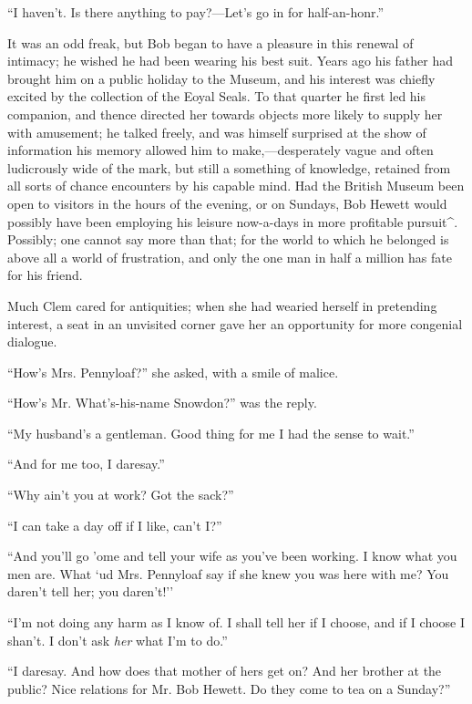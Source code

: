 {\protect\hypertarget{242}{}{}}``I haven't. Is there anything to
pay?---Let's go in for half-an-honr.''

It was an odd freak, but Bob began to have a pleasure in this renewal of
intimacy; he wished he had been wearing his best suit. Years ago his
father had brought him on a public holiday to the Museum, and his
interest was chiefly excited by the collection of the Eoyal Seals. To
that quarter he first led his companion, and thence directed her towards
objects more likely to supply her with amusement; he talked freely, and
was himself surprised at the show of information his memory allowed him
to make,---desperately vague and often ludicrously wide of the mark, but
still a something of knowledge, retained from all sorts of chance
encounters by his capable mind. Had the British Museum been open to
visitors in the hours of the evening, or on Sundays, Bob Hewett would
possibly have been employing his leisure now-a-days in more profitable
pursuit\^{}. Possibly; one cannot say more than that; for the world to
which he belonged is above all {\protect\hypertarget{243}{}{}}a world of
frustration, and only the one man in half a million has fate for his
friend.

Much Clem cared for antiquities; when she had wearied herself in
pretending interest, a seat in an unvisited corner gave her an
opportunity for more congenial dialogue.

``How's Mrs. Pennyloaf?'' she asked, with a smile of malice.

``How's Mr. What's-his-name Snowdon?'' was the reply.

``My husband's a gentleman. Good thing for me I had the sense to wait.''

``And for me too, I daresay.''

``Why ain't you at work? Got the sack?''

``I can take a day off if I like, can't I?''

``And you'll go 'ome and tell your wife as you've been working. I know
what you men are. What `ud Mrs. Pennyloaf say if she knew you was here
with me? You daren't tell her; you daren't!''

``I'm not doing any harm as I know of. I shall tell her if I choose, and
if I choose I shan't. I don't ask \emph{her} what I'm to do.''

``I daresay. And how does that mother of
{\protect\hypertarget{244}{}{}}hers get on? And her brother at the
public? Nice relations for Mr. Bob Hewett. Do they come to tea on a
Sunday?''

